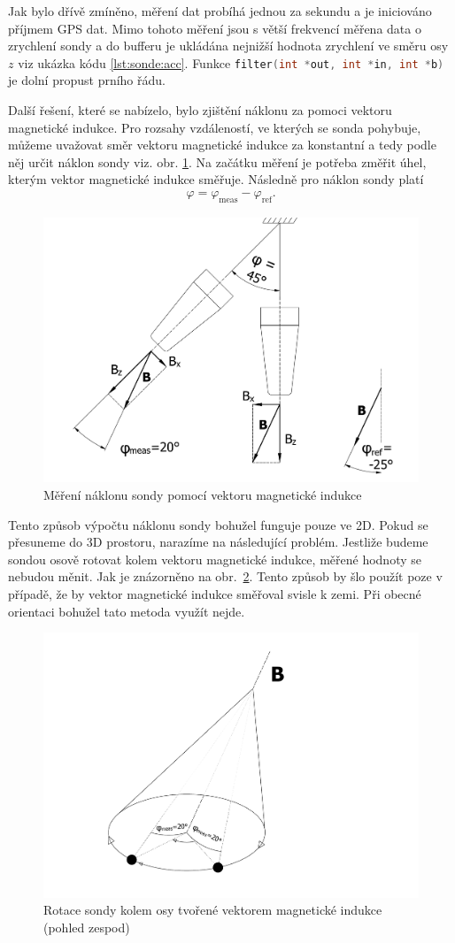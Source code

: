 \documentclass[twoside]{ctuthesis}
\theoremstyle{plain}
\theoremstyle{definition}
\theoremstyle{note}
\begin{document}
	Jak bylo dřívě zmíněno, měření dat probíhá jednou za sekundu a je iniciováno příjmem GPS dat. Mimo tohoto měření jsou s větší frekvencí měřena data o zrychlení sondy a do bufferu je ukládána nejnižší hodnota zrychlení ve směru osy $z$ viz ukázka kódu \ref{lst:sonde:acc}. Funkce \lstinline[language=C]|filter(int *out, int *in, int *b)| je dolní propust prního řádu.
		


	Další řešení, které se nabízelo, bylo zjištění náklonu za pomoci vektoru magnetické indukce. Pro rozsahy vzdáleností, ve kterých se sonda pohybuje, můžeme uvažovat směr vektoru magnetické indukce za konstantní a tedy podle něj určit náklon sondy viz. obr. \ref{fig:sonda:mag}. Na začátku měření je potřeba změřit úhel, kterým vektor magnetické indukce směřuje. Následně pro náklon sondy platí
	\begin{align}
		\varphi = \varphi_\text{meas} - \varphi_\text{ref}.
	\end{align}

	\begin{figure}[hbtp]
		\centering
		\includegraphics[width=.5\textwidth]{Figures/sonda_naklon_mag.pdf}
		\caption{Měření náklonu sondy pomocí vektoru magnetické indukce}
		\label{fig:sonda:mag}
	\end{figure}

	Tento způsob výpočtu náklonu sondy bohužel funguje pouze ve 2D. Pokud se přesuneme do 3D prostoru, narazíme na následující problém. Jestliže budeme sondou osově rotovat kolem vektoru magnetické indukce, měřené hodnoty se nebudou měnit. Jak je znázorněno na obr.~\ref{fig:sonda:mag:rot}. Tento způsob by šlo použít poze v případě, že by vektor magnetické indukce směřoval svisle k zemi. Při obecné orientaci bohužel tato metoda využít nejde.

	\begin{figure}
		\centering
		\includegraphics[width=.5\textwidth]{Figures/sonda_naklon_mag_osova_rotace.pdf}
		\caption{Rotace sondy kolem osy tvořené vektorem magnetické indukce (pohled zespod)}
		\label{fig:sonda:mag:rot}
	\end{figure}
	
\end{document}
